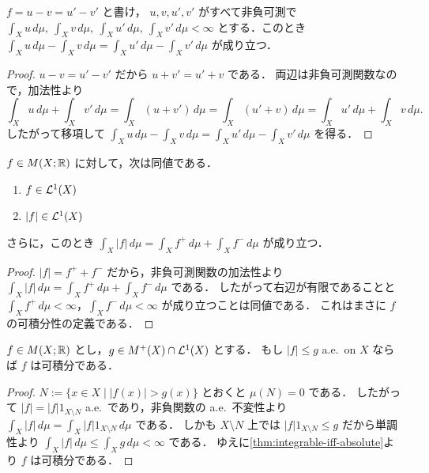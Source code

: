 \begin{proposition}[表示の独立性]\label{prop:integral-representation-independence}
$f=u-v=u'-v'$ と書け，
$u,v,u',v'$ がすべて非負可測で
$\int_X u\,d\mu,\ \int_X v\,d\mu,\ \int_X u'\,d\mu,\ \int_X v'\,d\mu<\infty$
とする．このとき
$\int_X u\,d\mu-\int_X v\,d\mu=\int_X u'\,d\mu-\int_X v'\,d\mu$ が成り立つ．
\end{proposition}
\begin{proof}
$u-v=u'-v'$ だから $u+v'=u'+v$ である．
両辺は非負可測関数なので，加法性より
\[
\int_X u\,d\mu+\int_X v'\,d\mu
=\int_X (u+v')\,d\mu
=\int_X (u'+v)\,d\mu
=\int_X u'\,d\mu+\int_X v\,d\mu.
\]
したがって移項して
$\int_X u\,d\mu-\int_X v\,d\mu
=\int_X u'\,d\mu-\int_X v'\,d\mu$ を得る．
\end{proof}

\begin{theorem}[可積分性と絶対値]\label{thm:integrable-iff-absolute}
$f\in M(X;\mathbb R)$ に対して，次は同値である．
\begin{enumerate}
    \item $f\in\mathcal L^1(X)$
    \item $|f|\in\mathcal L^1(X)$
\end{enumerate}
さらに，このとき
$\int_X |f|\,d\mu=\int_X f^+\,d\mu+\int_X f^-\,d\mu$ が成り立つ．
\end{theorem}
\begin{proof}
$|f|=f^++f^-$ だから，非負可測関数の加法性より
$\int_X |f|\,d\mu=\int_X f^+\,d\mu+\int_X f^-\,d\mu$ である．
したがって右辺が有限であることと
$\int_X f^+\,d\mu<\infty$，$\int_X f^-\,d\mu<\infty$ が成り立つことは同値である．
これはまさに $f$ の可積分性の定義である．
\end{proof}

\begin{corollary}[優関数による可積分性の判定]\label{cor:dominated-integrability}
$f\in M(X;\mathbb R)$ とし，$g\in M^+(X)\cap\mathcal L^1(X)$ とする．
もし $|f|\le g$ a.e.\ on $X$ ならば $f$ は可積分である．
\end{corollary}
\begin{proof}
$N:=\{x \in X \mid |f(x)|>g(x)\}$ とおくと $\mu(N)=0$ である．
したがって
$|f|=|f|1_{X\setminus N}$ a.e.\ であり，非負関数の a.e.\ 不変性より
$\int_X |f|\,d\mu=\int_X |f|1_{X\setminus N}\,d\mu$ である．
しかも $X\setminus N$ 上では $|f|1_{X\setminus N}\le g$ だから単調性より
$\int_X |f|\,d\mu\le \int_X g\,d\mu<\infty$ である．
ゆえに\cref{thm:integrable-iff-absolute}より $f$ は可積分である．
\end{proof}

